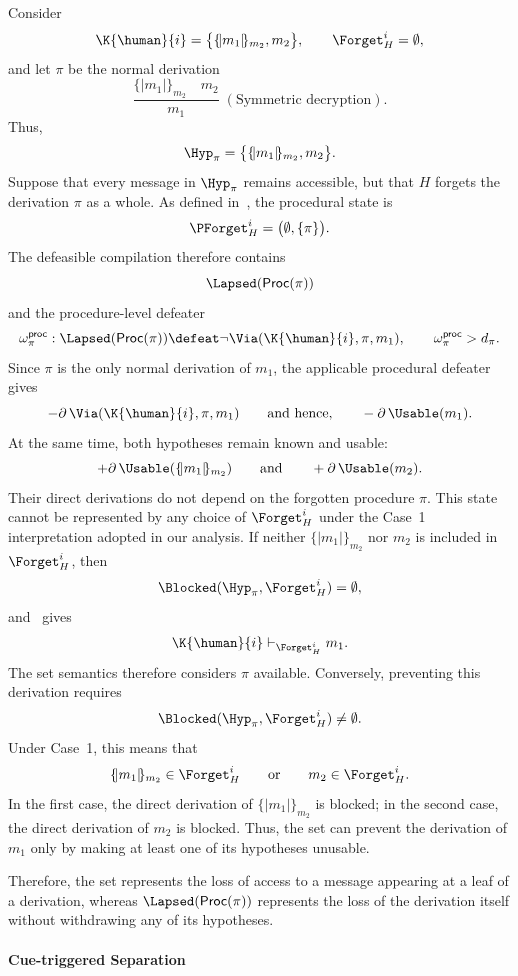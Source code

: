 Consider 
\[ 
    \K{\human}{i} = \bigl\{ \{\!|m_1|\!\}_{m_2}, m_2 \bigr\}, \qquad \Forget_H^i=\emptyset, 
\] 
and let \(\pi\) be the normal derivation 
\[ 
    \frac{\{\!|m_1|\!\}_{m_2}\quad m_2}{m_1} \;(\text{Symmetric decryption}). 
\] 
Thus, 
\[ 
    \Hyp_{\pi} = \bigl\{ \{\!|m_1|\!\}_{m_2}, m_2 \bigr\}. 
\] 
Suppose that every message in \(\Hyp_{\pi}\) remains accessible, but that \(H\) forgets the derivation \(\pi\) as a whole. As defined in~, the procedural state is 
\[ 
    \PForget_H^i = \bigl(\emptyset,\{\pi\}\bigr). 
\] 
The defeasible compilation therefore contains 
\[ 
    \Lapsed(\mathsf{Proc}(\pi)) 
\] 
and the procedure-level defeater 
\[ 
    \omega^{\mathsf{proc}}_{\pi}: \Lapsed(\mathsf{Proc}(\pi)) \defeat \neg\Via(\K{\human}{i},\pi,m_1), \qquad \omega^{\mathsf{proc}}_{\pi}>d_{\pi}. 
\] 
Since \(\pi\) is the only normal derivation of \(m_1\), the applicable procedural defeater gives 
\[ 
    -\partial\,\Via(\K{\human}{i},\pi,m_1) \qquad\text{and hence,}\qquad -\partial\,\Usable(m_1). 
\] 
At the same time, both hypotheses remain known and usable: 
\[ 
    +\partial\,\Usable(\{\!|m_1|\!\}_{m_2}) \qquad\text{and}\qquad +\partial\,\Usable(m_2). 
\] 
Their direct derivations do not depend on the forgotten procedure \(\pi\). This state cannot be represented by any choice of \(\Forget_H^i\) under the Case~1 interpretation adopted in our analysis. If neither \(\{\!|m_1|\!\}_{m_2}\) nor \(m_2\) is included in \(\Forget_H^i\), then 
\[ 
    \Blocked (\Hyp_{\pi},\Forget_H^i) = \emptyset, 
\] and~ gives 
\[ 
    \K{\human}{i} \vdash_{\Forget_H^i} m_1. 
\] 
The \Forget{} set semantics therefore considers \(\pi\) available. Conversely, preventing this derivation requires 
\[ 
    \Blocked (\Hyp_{\pi},\Forget_H^i) \neq \emptyset. 
\] Under Case~1, this means that 
\[ 
    \{\!|m_1|\!\}_{m_2}\in\Forget_H^i \qquad\text{or}\qquad m_2\in\Forget_H^i. 
\] 
In the first case, the direct derivation of \(\{\!|m_1|\!\}_{m_2}\) is blocked; in the second case, the direct derivation of \(m_2\) is blocked. Thus, the \Forget{} set can prevent the derivation of \(m_1\) only by making at least one of its hypotheses unusable.

Therefore, the \Forget{} set represents the loss of access to a message appearing at a leaf of a derivation, whereas \(\Lapsed(\mathsf{Proc}(\pi))\) represents the loss of the derivation itself without withdrawing any of its hypotheses. 

\paragraph{Cue-triggered Separation} 

